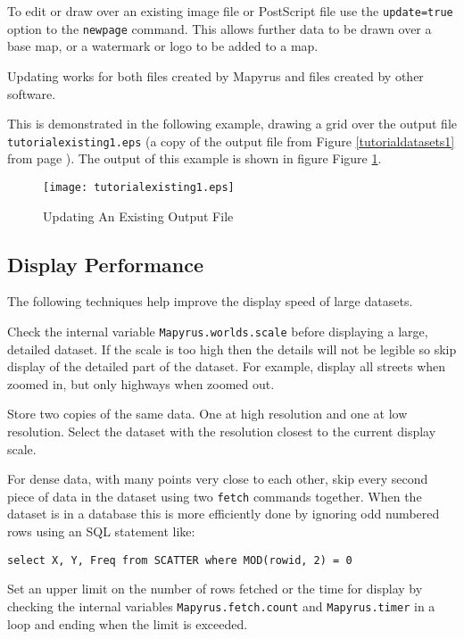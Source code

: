 To edit or draw over an existing image file or PostScript file use
the \texttt{update=true} option to the \texttt{newpage} command.
This allows further data to be drawn over a base map, or a watermark
or logo to be added to a map.

Updating works for both files created by Mapyrus and files created
by other software.

This is demonstrated in the following example, drawing a grid over
the output file \texttt{tutorialexisting1.eps} (a copy of the output file
from Figure \ref{tutorialdatasets1} from page \pageref{tutorialdatasets1}).
The output of this example is shown in figure
Figure \ref{tutorialexisting1}.



\begin{figure}[htb]
\texttt{[image: tutorialexisting1.eps]}
\caption{Updating An Existing Output File}
\label{tutorialexisting1}
\end{figure}

\subsection{Display Performance}

The following techniques help improve the display speed of large datasets.

Check the internal variable \texttt{Mapyrus.worlds.scale} before displaying a
large, detailed dataset.  If the scale is too high then the details will not be
legible so skip display of the detailed part of the dataset.  For example,
display all streets when zoomed in, but only highways when zoomed out.

Store two copies of the same data.  One at high resolution and one at low
resolution.  Select the dataset with the resolution closest to the current
display scale.

For dense data, with many points very close to each other, skip every second
piece of data in the dataset using two \texttt{fetch} commands together.  When
the dataset is in a database this is more efficiently done by ignoring odd
numbered rows using an SQL statement like:

\begin{verbatim}
select X, Y, Freq from SCATTER where MOD(rowid, 2) = 0
\end{verbatim}

Set an upper limit on the number of rows fetched or the time for display by
checking the internal variables \texttt{Mapyrus.fetch.count} and
\texttt{Mapyrus.timer} in a loop and ending when the limit is exceeded.

